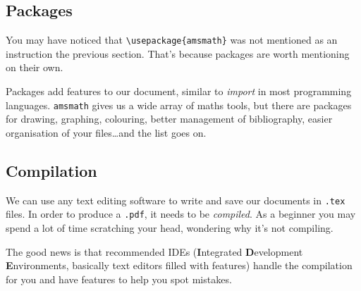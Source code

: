 \subsection{Packages}
    You may have noticed that \verb|\usepackage{amsmath}| was not mentioned as an instruction the previous section. That's because packages are worth mentioning on their own.

    Packages add features to our document, similar to \emph{import} in most programming languages.
    \verb|amsmath| gives us a wide array of maths tools, but there are packages for drawing, graphing, colouring, better management of bibliography, easier organisation of your files\dots and the list goes on.
    
\subsection{Compilation}
    We can use any text editing software to write and save our documents in \verb|.tex| files. In order to produce a \verb|.pdf|, it needs to be \emph{compiled}.
    As a beginner you may spend a lot of time scratching your head, wondering why it's not compiling.
    
    The good news is that recommended IDEs (\textbf{I}ntegrated \textbf{D}evelopment \textbf{E}nvironments, basically text editors filled with features) handle the compilation for you and have features to help you spot mistakes.